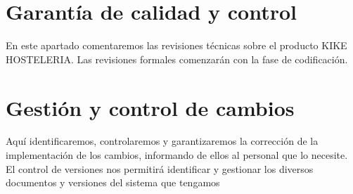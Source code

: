 \documentclass[spanish,a4paper,12pt]{report}	%
\begin{document}
	\section{Garantía de calidad y control} 
En este apartado comentaremos las revisiones técnicas sobre el producto KIKE HOSTELERIA. Las revisiones formales comenzarán con la fase de codificación.

	\section{Gestión y control de cambios}
Aquí identificaremos, controlaremos y garantizaremos la corrección de la implementación de los cambios, informando de ellos al personal que lo necesite.
El control de versiones nos permitirá identificar y gestionar los diversos documentos y versiones del sistema que tengamos


\newpage
\mbox{}
\thispagestyle{empty}						%
\newpage


\newpage
\mbox{}
\thispagestyle{empty}						%
\newpage
\end{document}
